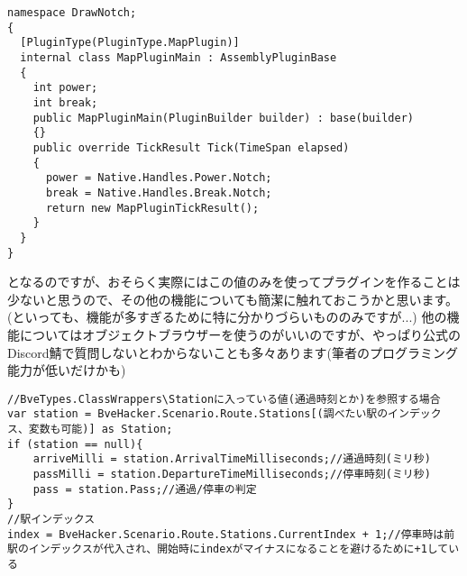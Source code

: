 \documentclass[b5paper,9pt,platex,dvipdfmx]{jsarticle}
\begin{document}
\begin{multicols*}{3}
\begin{lstlisting}[caption= MapPlugin.cs]
namespace DrawNotch;
{
  [PluginType(PluginType.MapPlugin)]
  internal class MapPluginMain : AssemblyPluginBase
  {
    int power;
    int break;
    public MapPluginMain(PluginBuilder builder) : base(builder)
    {}
    public override TickResult Tick(TimeSpan elapsed)
    {
      power = Native.Handles.Power.Notch;
      break = Native.Handles.Break.Notch;
      return new MapPluginTickResult();
    }
  }
}
\end{lstlisting}
となるのですが、おそらく実際にはこの値のみを使ってプラグインを作ることは少ないと思うので、その他の機能についても簡潔に触れておこうかと思います。\\
(といっても、機能が多すぎるために特に分かりづらいもののみですが...)
他の機能についてはオブジェクトブラウザーを使うのがいいのですが、やっぱり公式のDiscord鯖で質問しないとわからないことも多々あります(筆者のプログラミング能力が低いだけかも)\\
\begin{lstlisting}[caption= MapPlugin.cs]
//BveTypes.ClassWrappers\Stationに入っている値(通過時刻とか)を参照する場合
var station = BveHacker.Scenario.Route.Stations[(調べたい駅のインデックス、変数も可能)] as Station;
if (station == null){
    arriveMilli = station.ArrivalTimeMilliseconds;//通過時刻(ミリ秒)
    passMilli = station.DepartureTimeMilliseconds;//停車時刻(ミリ秒)
    pass = station.Pass;//通過/停車の判定
}
//駅インデックス
index = BveHacker.Scenario.Route.Stations.CurrentIndex + 1;//停車時は前駅のインデックスが代入され、開始時にindexがマイナスになることを避けるために+1している
\end{lstlisting}




\end{multicols*}
\end{document}
